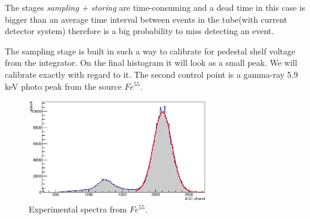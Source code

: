 \documentclass[12pt,a4paper]{article}
\begin{document}
	The stages {\it sampling + storing} are time-consuming and a dead time in this case is bigger than an average time interval between events in the tube(with current detector system) therefore is a big probability to miss detecting an event.
	
	The sampling stage is built in such a way to calibrate for pedestal shelf voltage from the integrator. On the final histogram it will look as a small peak. We will calibrate exactly with regard to it. The second control point is a gamma-ray 5.9 keV photo peak from the source $Fe^{55}$.
	
	\begin{figure}
	\centering
	\includegraphics[width=0.7\textwidth]{expFitted1750}
	
	\caption{Experimental spectra from $Fe^{55}$.}
	\label{fig:expFitted1750}
	\end{figure}
	
	
	
	
	
\end{document}
